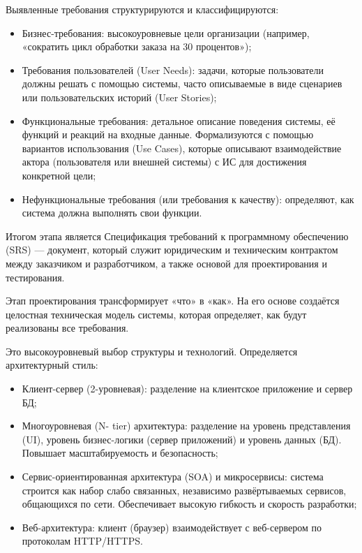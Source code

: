 \documentclass{SibFU-docs}
\begin{document}
\vspace{1em}


Выявленные требования структурируются и классифицируются:

\begin{itemize}[label=-]
\item Бизнес-требования: высокоуровневые цели организации (например, «сократить цикл обработки заказа на 30 процентов»);
\item Требования пользователей (User Needs): задачи, которые пользователи должны решать с помощью системы, часто описываемые в виде сценариев или пользовательских историй (User Stories);
\item Функциональные требования: детальное описание поведения системы, её функций и реакций на входные данные. Формализуются с помощью вариантов использования (Use Cases), которые описывают взаимодействие актора (пользователя или внешней системы) с ИС для достижения конкретной цели;
\item Нефункциональные требования (или требования к качеству): определяют, как система должна выполнять свои функции.
\end{itemize}

\vspace{1em}

Итогом этапа является Спецификация требований к программному обеспечению (SRS) — документ, который служит юридическим и техническим контрактом между заказчиком и разработчиком, а также основой для проектирования и тестирования. \cite{kotonya1998requirements, ieee830, ISO25010_2011}


Этап проектирования трансформирует «что» в «как». На его основе создаётся целостная техническая модель системы, которая определяет, как будут реализованы все требования.

Это высокоуровневый выбор структуры и технологий. Определяется архитектурный стиль:

\begin{itemize}[label=-]
\item Клиент-сервер (2-уровневая): разделение на клиентское приложение и сервер БД;
\item Многоуровневая (N- tier) архитектура: разделение на уровень представления (UI), уровень бизнес-логики (сервер приложений) и уровень данных (БД). Повышает масштабируемость и безопасность;
\item Сервис-ориентированная архитектура (SOA) и микросервисы: система строится как набор слабо связанных, независимо развёртываемых сервисов, общающихся по сети. Обеспечивает высокую гибкость и скорость разработки;
\item Веб-архитектура: клиент (браузер) взаимодействует с веб-сервером по протоколам HTTP/HTTPS.
\end{itemize}
\end{document}
